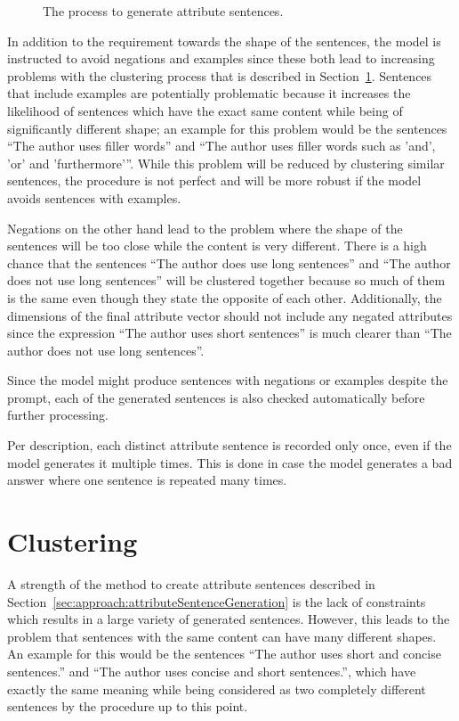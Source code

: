 \begin{figure}[ht]
  
  \caption{The process to generate attribute sentences.}
  \label{fig:attributeSentenceGeneration}
\end{figure}

In addition to the requirement towards the shape of the sentences, the model is instructed to avoid negations and examples since these both lead to increasing problems with the clustering process that is described in Section~\ref{sec:approach:clustering}.
Sentences that include examples are potentially problematic because it increases the likelihood of sentences which have the exact same content while being of significantly different shape; an example for this problem would be the sentences \enquote{The author uses filler words} and \enquote{The author uses filler words such as 'and', 'or' and 'furthermore'}. While this problem will be reduced by clustering similar sentences, the procedure is not perfect and will be more robust if the model avoids sentences with examples.

Negations on the other hand lead to the problem where the shape of the sentences will be too close while the content is very different. There is a high chance that the sentences \enquote{The author does use long sentences} and \enquote{The author does not use long sentences} will be clustered together because so much of them is the same even though they state the opposite of each other.
Additionally, the dimensions of the final attribute vector should not include any negated attributes since the expression \enquote{The author uses short sentences} is much clearer than \enquote{The author does not use long sentences}.

Since the model might produce sentences with negations or examples despite the prompt, each of the generated sentences is also checked automatically before further processing.

Per description, each distinct attribute sentence is recorded only once, even if the model generates it multiple times. This is done in case the model generates a bad answer where one sentence is repeated many times.


\section{Clustering}
\label{sec:approach:clustering}
A strength of the method to create attribute sentences described in Section~\ref{sec:approach:attributeSentenceGeneration} is the lack of constraints which results in a large variety of generated sentences. However, this leads to the problem that sentences with the same content can have many different shapes. An example for this would be the sentences \enquote{The author uses short and concise sentences.} and \enquote{The author uses concise and short sentences.}, which have exactly the same meaning while being considered as two completely different sentences by the procedure up to this point.

